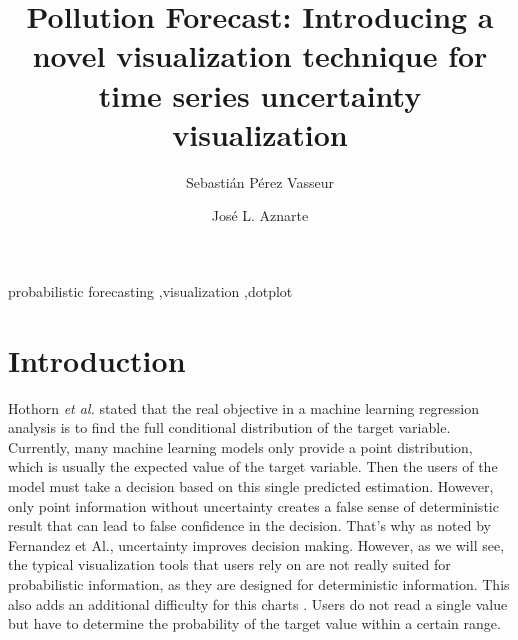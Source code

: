 \documentclass[a4paper,3p,sort&compress]{elsarticle}
\begin{document}
\linenumbers

\newcommand{\no}{NO\textsubscript{2}\xspace}

\begin{frontmatter}

  \title{Pollution Forecast: Introducing a novel visualization technique for time series uncertainty visualization}


  \author{Sebasti\'an P\'erez Vasseur}
  \author{Jos\'e L. Aznarte}
  \address{Artificial Intelligence Department\\Universidad Nacional de
    Educaci\'on a Distancia --- UNED\\c/ Juan del Rosal, 16, Madrid, Spain}
  

\begin{abstract}
  
\end{abstract}

\begin{keyword}
probabilistic forecasting \sep visualization \sep dotplot
\end{keyword}

\end{frontmatter}


\section{Introduction}
\label{sec:intro}

 Hothorn \emph{et al.} stated that
the real objective in a machine learning regression analysis is to find the full
conditional distribution of the target variable. Currently, many machine learning models only provide a point
distribution, which is usually the expected value of the target variable. Then
the users of the model must take a decision based on this single predicted
estimation. However, only point information without uncertainty creates a false
sense of deterministic result that can lead to false confidence in the decision.
That's why as noted by Fernandez et Al., uncertainty improves decision making.
However, as we will see, the typical visualization tools that users rely on are
not really suited for probabilistic information, as they are designed for
deterministic information. This also adds an additional difficulty for this
charts . Users do not
read a single value but have to determine the probability of the target value
within a certain range.
\end{document}

